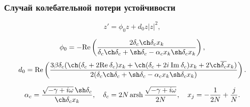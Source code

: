 \documentclass[fullscreen=true, unicode, bookmarks=false]{beamer}
\DeclareMathOperator{\arsh}{arsh}
\begin{document}
\begin{frame}
\frametitle{ Случай колебательной потери устойчивости }

\begin{equation}
	z' = \phi_0 z + d_0 z |z|^2,
\end{equation}

\vfill

$$ \phi_0 = -\mbox{Re} \left(\dfrac{2 \delta_c \ch \delta_c x_k}{\delta_c\ch \delta_c + \sh \delta_c - \alpha_c x_k \sh \delta_c x_k} \right), $$
$$ d_0 = \mbox{Re} \left( \dfrac{3 \beta \delta_c (\ch (\delta_c + 2\mbox{Re}\:\delta_c) x_k + \ch (\delta_c + 2i\:\mbox{Im}\:\delta_c) x_k + 2 \ch \overline{\delta_c} x_k)}{2(\delta_c\ch \delta_c + \sh \delta_c - \alpha_c x_k \sh \delta_c x_k)} \right). $$

\vfill

$$ \alpha_c = \frac{ \sqrt{-\gamma + i \omega} \, \sh \delta_c }{ \ch\delta_c x_k }, \quad  \delta_c = 2N \arsh \dfrac{\sqrt{-\gamma + i \omega}}{2N}, \quad x_j = -\dfrac{1}{2N} + \dfrac{j}{N}. $$

\end{frame}
\end{document}
